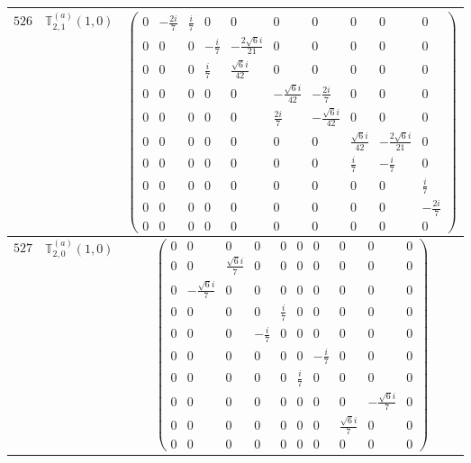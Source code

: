 \documentclass[fleqn,8pt,landscape]{jsarticle}
\begin{document}
\begin{center}
\begin{longtable}{ccc}
$ 526 $ & $ \mathbb{T}_{2,1}^{(a)}(1,0) $ & $ \begin{pmatrix} 0 & - \frac{2 i}{7} & \frac{i}{7} & 0 & 0 & 0 & 0 & 0 & 0 & 0 \\ 0 & 0 & 0 & - \frac{i}{7} & - \frac{2 \sqrt{6} i}{21} & 0 & 0 & 0 & 0 & 0 \\ 0 & 0 & 0 & \frac{i}{7} & \frac{\sqrt{6} i}{42} & 0 & 0 & 0 & 0 & 0 \\ 0 & 0 & 0 & 0 & 0 & - \frac{\sqrt{6} i}{42} & - \frac{2 i}{7} & 0 & 0 & 0 \\ 0 & 0 & 0 & 0 & 0 & \frac{2 i}{7} & - \frac{\sqrt{6} i}{42} & 0 & 0 & 0 \\ 0 & 0 & 0 & 0 & 0 & 0 & 0 & \frac{\sqrt{6} i}{42} & - \frac{2 \sqrt{6} i}{21} & 0 \\ 0 & 0 & 0 & 0 & 0 & 0 & 0 & \frac{i}{7} & - \frac{i}{7} & 0 \\ 0 & 0 & 0 & 0 & 0 & 0 & 0 & 0 & 0 & \frac{i}{7} \\ 0 & 0 & 0 & 0 & 0 & 0 & 0 & 0 & 0 & - \frac{2 i}{7} \\ 0 & 0 & 0 & 0 & 0 & 0 & 0 & 0 & 0 & 0 \end{pmatrix} $ \\ \hline
$ 527 $ & $ \mathbb{T}_{2,0}^{(a)}(1,0) $ & $ \begin{pmatrix} 0 & 0 & 0 & 0 & 0 & 0 & 0 & 0 & 0 & 0 \\ 0 & 0 & \frac{\sqrt{6} i}{7} & 0 & 0 & 0 & 0 & 0 & 0 & 0 \\ 0 & - \frac{\sqrt{6} i}{7} & 0 & 0 & 0 & 0 & 0 & 0 & 0 & 0 \\ 0 & 0 & 0 & 0 & \frac{i}{7} & 0 & 0 & 0 & 0 & 0 \\ 0 & 0 & 0 & - \frac{i}{7} & 0 & 0 & 0 & 0 & 0 & 0 \\ 0 & 0 & 0 & 0 & 0 & 0 & - \frac{i}{7} & 0 & 0 & 0 \\ 0 & 0 & 0 & 0 & 0 & \frac{i}{7} & 0 & 0 & 0 & 0 \\ 0 & 0 & 0 & 0 & 0 & 0 & 0 & 0 & - \frac{\sqrt{6} i}{7} & 0 \\ 0 & 0 & 0 & 0 & 0 & 0 & 0 & \frac{\sqrt{6} i}{7} & 0 & 0 \\ 0 & 0 & 0 & 0 & 0 & 0 & 0 & 0 & 0 & 0 \end{pmatrix} $ \\ \hline

\end{longtable}
\end{center}
\end{document}
